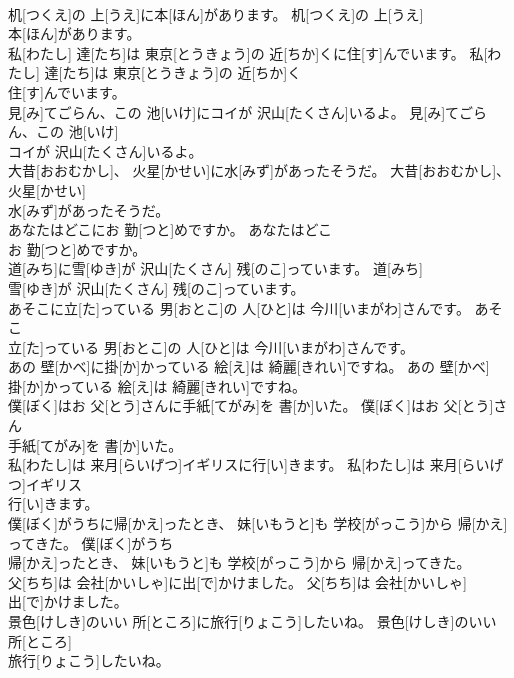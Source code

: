 \documentclass[8pt]{extreport}
\begin{document}
\begin{CJK}{UTF8}{min}
\\	机[つくえ]の 上[うえ]に本[ほん]があります。	机[つくえ]の 上[うえ]
\\	本[ほん]があります。	
\\	私[わたし] 達[たち]は 東京[とうきょう]の 近[ちか]くに住[す]んでいます。	私[わたし] 達[たち]は 東京[とうきょう]の 近[ちか]く
\\	住[す]んでいます。	
\\	見[み]てごらん、この 池[いけ]にコイが 沢山[たくさん]いるよ。	見[み]てごらん、この 池[いけ]
\\	コイが 沢山[たくさん]いるよ。	
\\	大昔[おおむかし]、 火星[かせい]に水[みず]があったそうだ。	大昔[おおむかし]、 火星[かせい]
\\	水[みず]があったそうだ。	
\\	あなたはどこにお 勤[つと]めですか。	あなたはどこ
\\	お 勤[つと]めですか。	
\\	道[みち]に雪[ゆき]が 沢山[たくさん] 残[のこ]っています。	道[みち]
\\	雪[ゆき]が 沢山[たくさん] 残[のこ]っています。	
\\	あそこに立[た]っている 男[おとこ]の 人[ひと]は 今川[いまがわ]さんです。	あそこ
\\	立[た]っている 男[おとこ]の 人[ひと]は 今川[いまがわ]さんです。	
\\	あの 壁[かべ]に掛[か]かっている 絵[え]は 綺麗[きれい]ですね。	あの 壁[かべ]
\\	掛[か]かっている 絵[え]は 綺麗[きれい]ですね。	
\\	僕[ぼく]はお 父[とう]さんに手紙[てがみ]を 書[か]いた。	僕[ぼく]はお 父[とう]さん
\\	手紙[てがみ]を 書[か]いた。	
\\	私[わたし]は 来月[らいげつ]イギリスに行[い]きます。	私[わたし]は 来月[らいげつ]イギリス
\\	行[い]きます。	
\\	僕[ぼく]がうちに帰[かえ]ったとき、 妹[いもうと]も 学校[がっこう]から 帰[かえ]ってきた。	僕[ぼく]がうち
\\	帰[かえ]ったとき、 妹[いもうと]も 学校[がっこう]から 帰[かえ]ってきた。	
\\	父[ちち]は 会社[かいしゃ]に出[で]かけました。	父[ちち]は 会社[かいしゃ]
\\	出[で]かけました。	
\\	景色[けしき]のいい 所[ところ]に旅行[りょこう]したいね。	景色[けしき]のいい 所[ところ]
\\	旅行[りょこう]したいね。	

\end{CJK}
\end{document}
